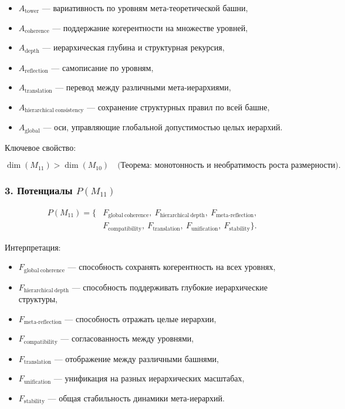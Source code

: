 \begin{itemize}
    \item $A_{\mathrm{tower}}$ — вариативность по уровням мета-теоретической башни,
    \item $A_{\mathrm{coherence}}$ — поддержание когерентности на множестве уровней,
    \item $A_{\mathrm{depth}}$ — иерархическая глубина и структурная рекурсия,
    \item $A_{\mathrm{reflection}}$ — самописание по уровням,
    \item $A_{\mathrm{translation}}$ — перевод между различными мета-иерархиями,
    \item $A_{\mathrm{hierarchical\ consistency}}$ — сохранение структурных правил по всей башне,
    \item $A_{\mathrm{global}}$ — оси, управляющие глобальной допустимостью целых иерархий.
\end{itemize}

Ключевое свойство:

\[
\dim(M_{11}) > \dim(M_{10})
\quad\text{(Теорема: монотонность и необратимость роста размерности)}.
\]

\subsubsection*{3. Потенциалы \texorpdfstring{$P(M_{11})$}{P(M_{11})}}

\[
\begin{aligned}
P(M_{11}) = \{&
F_{\mathrm{global\ coherence}},\
F_{\mathrm{hierarchical\ depth}},\
F_{\mathrm{meta\mbox{-}reflection}},\\
&
F_{\mathrm{compatibility}},\
F_{\mathrm{translation}},\
F_{\mathrm{unification}},\
F_{\mathrm{stability}}
\}.
\end{aligned}
\]

Интерпретация:

\begin{itemize}
    \item $F_{\mathrm{global\ coherence}}$ — способность сохранять когерентность на всех уровнях,
    \item $F_{\mathrm{hierarchical\ depth}}$ — способность поддерживать глубокие иерархические структуры,
    \item $F_{\mathrm{meta\mbox{-}reflection}}$ — способность отражать целые иерархии,
    \item $F_{\mathrm{compatibility}}$ — согласованность между уровнями,
    \item $F_{\mathrm{translation}}$ — отображение между различными башнями,
    \item $F_{\mathrm{unification}}$ — унификация на разных иерархических масштабах,
    \item $F_{\mathrm{stability}}$ — общая стабильность динамики мета-иерархий.
\end{itemize}

